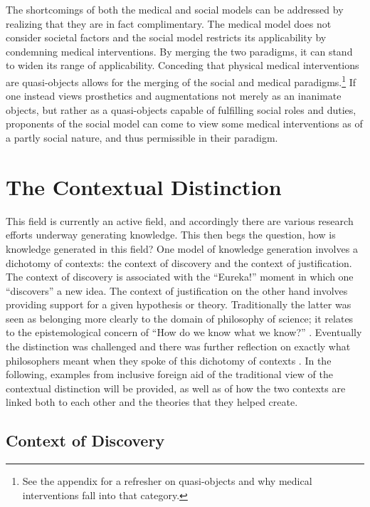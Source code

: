 \documentclass[a4paper]{article}
\begin{document}
The shortcomings of both the medical and social models can be addressed by
realizing that they are in fact complimentary. The medical model does not
consider societal factors and the social model restricts its applicability by
condemning medical interventions. By merging the two paradigms, it can stand
to widen its range of applicability. Conceding that physical medical
interventions are  quasi-objects allows for the merging of the social and
medical paradigms.\footnote{See the appendix for a refresher on quasi-objects
and why medical interventions fall into that category.} If one instead views
prosthetics and augmentations not merely as an inanimate objects, but rather
as a quasi-objects capable of fulfilling social roles and duties, proponents
of the social model can come to view some medical interventions as of a partly
social nature, and thus permissible in their paradigm.

\newpage
\section{The Contextual Distinction}

This field is currently an active field, and accordingly there are various
research efforts underway generating knowledge. This then begs the question,
how is knowledge generated in this field? One model of knowledge generation
involves a dichotomy of contexts: the context of discovery and the context of
justification. The context of discovery is associated with the ``Eureka!''
moment in which one ``discovers'' a new idea. The context of justification on
the other hand involves providing support for a given hypothesis or theory.
Traditionally the latter was seen as belonging more clearly to the domain of
philosophy of science; it relates to the epistemological concern of ``How do
we know what we know?'' \citep{schickore2014scientific}. Eventually the
distinction was challenged and there was further reflection on exactly what
philosophers meant when they spoke of this dichotomy of contexts
\citep{hoyningen2006context}. In the following, examples from inclusive
foreign aid of the traditional view of the contextual distinction will be
provided, as well as of how the two contexts are linked both to each other and
the theories that they helped create.

\subsection{Context of Discovery}
\end{document}
